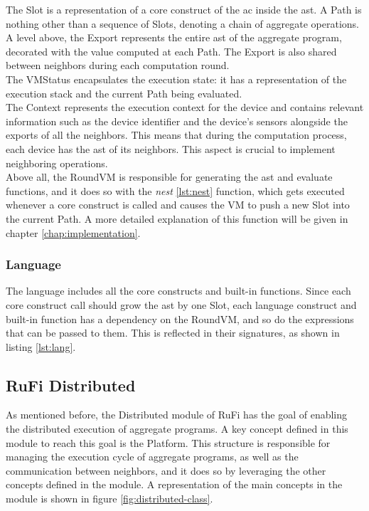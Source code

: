 The Slot is a representation of a core construct of the \ac{ac} inside the \ac{ast}. A Path is nothing other than a sequence of Slots, denoting a chain of aggregate operations.\\
A level above, the Export represents the entire \ac{ast} of the aggregate program, decorated with the value computed at each Path. The Export is also shared between neighbors during each
computation round.\\
The VMStatus encapsulates the execution state: it has a representation of the execution stack and the current Path being evaluated.\\
The Context represents the execution context for the device and contains relevant information such as the device identifier and the device's sensors alongside the exports of all the neighbors.
This means that during the computation process, each device has the \ac{ast} of its neighbors. This aspect is crucial to implement neighboring operations.\\
Above all, the RoundVM is responsible for generating the \ac{ast} and evaluate functions, and it does so with the \textit{nest} \ref{lst:nest} function, which gets executed whenever a core construct is called
and causes the VM to push a new Slot into the current Path. A more detailed explanation of this function will be given in chapter \ref{chap:implementation}.

\subsubsection{Language}
The language includes all the core constructs and built-in functions. Since each core construct call should grow the \ac{ast} by one Slot, each language construct and built-in function has
a dependency on the RoundVM, and so do the expressions that can be passed to them. This is reflected in their signatures, as shown in listing \ref{lst:lang}.



\subsection{RuFi Distributed}
As mentioned before, the Distributed module of RuFi has the goal of enabling the distributed execution of aggregate programs. A key concept defined in this module to reach this goal is the Platform.
This structure is responsible for managing the execution cycle of aggregate programs, as well as the communication between neighbors, and it does so by leveraging the other concepts defined in the module.
A representation of the main concepts in the module is shown in figure \ref{fig:distributed-class}.


